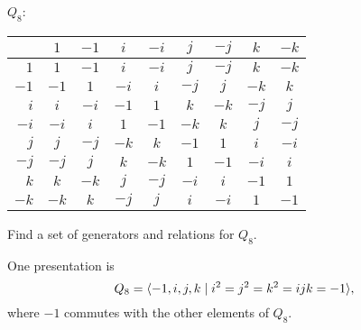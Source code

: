 \begin{solution}
  $Q_8$:
  \begin{center}
    \begin{tabular}{r|cccccccc}
      & $1$ & $-1$ & $i$ & $-i$ & $j$ & $-j$ & $k$ & $-k$ \\
      \hline
      $1$ & $1$ & $-1$ & $i$ & $-i$ & $j$ & $-j$ & $k$ & $-k$ \\
      $-1$ & $-1$ & $1$ & $-i$ & $i$ & $-j$ & $j$ & $-k$ & $k$ \\
      $i$ & $i$ & $-i$ & $-1$ & $1$ & $k$ & $-k$ & $-j$ & $j$ \\
      $-i$ & $-i$ & $i$ & $1$ & $-1$ & $-k$ & $k$ & $j$ & $-j$ \\
      $j$ & $j$ & $-j$ & $-k$ & $k$ & $-1$ & $1$ & $i$ & $-i$ \\
      $-j$ & $-j$ & $j$ & $k$ & $-k$ & $1$ & $-1$ & $-i$ & $i$ \\
      $k$ & $k$ & $-k$ & $j$ & $-j$ & $-i$ & $i$ & $-1$ & $1$ \\
      $-k$ & $-k$ & $k$ & $-j$ & $j$ & $i$ & $-i$ & $1$ & $-1$
    \end{tabular}
  \end{center}
\end{solution}

 Find a set of generators and relations for $Q_8$.
\label{exercise-presentation-for-q8}
\begin{solution}
  One presentation is
  \begin{equation*}
    Q_8 = \langle{-1,i,j,k \mid i^2 = j^2 = k^2 = ijk = -1}\rangle,
  \end{equation*}
  where $-1$ commutes with the other elements of $Q_8$.
\end{solution}
